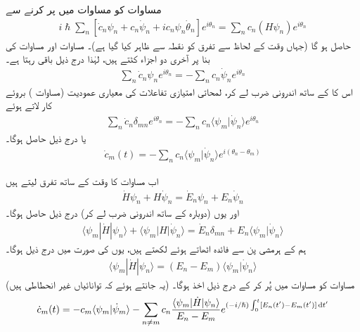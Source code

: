  مساوات  کو مساوات  میں پر کرنے سے
\begin{align}
i \hslash \sum_n [\dot{c}_n \psi_n + c_n \dot{\psi}_n + i c_n \psi_n \dot{\theta}_n] e^{i \theta_n} = \sum_n c_n (H \psi_n) e^{i \theta_n} 
\end{align}
حاصل ہو گا (جہاں وقت کے لحاظ سے تفرق کو نقطہ سے ظاہر کیا گیا ہے)۔ مساوات  اور مساوات  کی بنا پر آخری دو اجزاء کٹتے ہیں، لہٰذا درج ذیل باقی رہتا ہے۔ 
\begin{align}
\sum_n \dot{c}_n \psi_n e^{i \theta_n} = - \sum_n c_n \dot{\psi}_n e^{i \theta_n}
\end{align}
اس کا  کے ساتھ اندرونی ضرب لے کر، لمحاتی امتیازی تفاعلات کی معیاری عمودیت (مساوات ) بروئے کار لاتے ہوئے 
\begin{align*}
\sum_n \dot{c}_n \delta_{mn} e^{i \theta_n} = - \sum_n c_n \langle \psi_m | \dot{\psi}_n \rangle e^{i \theta_n}
\end{align*}
یا درج ذیل حاصل ہوگا۔ 
\begin{align}\label{مساوات_حر_تفرق_عددی_سر}
\dot{c}_m (t) = - \sum_n c_n \langle \psi_m | \dot{\psi}_n \rangle e^{i(\theta_n - \theta_m)}
\end{align}

اب مساوات  کا وقت کے ساتھ تفرق لیتے ہیں 
\begin{align*}
\dot{H} \psi_n + H \dot{\psi}_n = \dot{E}_n \psi_n + E_n \dot{\psi}_n
\end{align*}
اور یوں (دوبارہ  کے ساتھ اندرونی ضرب لے کر) درج ذیل حاصل ہوگا۔ 
\begin{align}
\langle \psi_m | \dot{H} | \psi_n \rangle + \langle \psi_m | H | \dot{\psi}_n \rangle = \dot{E}_n \delta_{mn} + E_n \langle \psi_m | \dot{\psi}_n \rangle
\end{align} 
ہم  کے ہرمشی پن سے فائدہ اٹھاتے ہوئے  لکھتے ہیں، یوں  کی صورت میں درج ذیل ہوگا۔
\begin{align}\label{مساوات_حر_نابرابر_صورت}
\langle \psi_m | \dot{H} | \psi_n \rangle = (E_n - E_m) \langle \psi_m | \dot{\psi}_n \rangle
\end{align}
(یہ جانتے ہوئے کہ توانائیاں غیر انحطاطی ہیں) مساوات  کو مساوات  میں پُر کر کے درج ذیل اخذ ہوگا۔
\begin{align}
\dot{c}_m (t) = - c_m \langle \psi_m | \dot{\psi}_m \rangle - \sum_{n \ne m} c_n \frac{\langle \psi_m | \dot{H} | \psi_n \rangle}{E_n - E_m} e ^{(- i / \hslash) \int_0^t [E_n(t') - E_m(t')] \dif t' }
\end{align}

